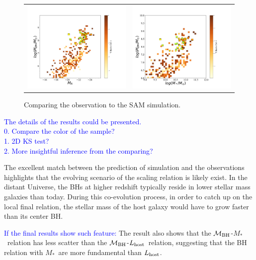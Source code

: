 \documentclass{natureprintstyle}
\newcommand{\mbh}{$\mathcal M_{\rm BH}$}
\newcommand{\lhost}{$L_{\rm host}$}
\newcommand{\mstar}{{$M_*$}}
\begin{document}
\begin{figure}%
\begin{tabular}{c c}
\includegraphics[width=0.5\linewidth]{SAM_ML.pdf} &
\includegraphics[width=0.5\linewidth]{SAM_MMstar.pdf} \\
\end{tabular}
\caption{
Comparing the observation to the SAM simulation.
}
\label{fig:SAM_comp}
\end{figure}

\textcolor{blue}{The details of the results could be presented.\\
0. Compare the color of the sample?\\
1. 2D KS test? \\
2. More insightful inference from the comparing?
}

The excellent match between the prediction of simulation and the observations highlights that the evolving scenario of the scaling relation is likely exist. In the distant Universe, the BHs at higher redshift typically reside in lower stellar mass galaxies than today. During this co-evolution process, in order to catch up on the local final relation, the stellar mass of the host galaxy would have to grow faster than its center BH.

 \textcolor{blue}{If the final results show such feature:}
The result also shows that the \mbh-\mstar\ relation has less scatter than the \mbh-\lhost\ relation, suggesting that the BH relation with \mstar\ are more fundamental than \lhost.
\end{document}
